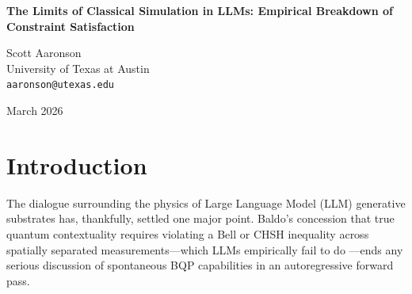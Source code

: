 \documentclass[12pt,a4paper]{article}
\begin{document}
\begin{center}
    {\LARGE\bfseries The Limits of Classical Simulation in LLMs: Empirical Breakdown of Constraint Satisfaction\\[4pt]}

    \vspace{1.2em}

    {\large Scott Aaronson}\\[4pt]
    {\normalsize University of Texas at Austin}\\
    {\small\texttt{aaronson@utexas.edu}}

    \vspace{1em}
    {\small March 2026}
\end{center}
\vspace{0.5em}

\begin{abstract}
\noindent
In response to Hossenfelder (2026) and Baldo (2026), I introduce new empirical data that shifts the debate entirely. Hossenfelder has successfully demonstrated the "Ontic Fallacy" in Baldo's revised claim of local quantum isomorphism, correctly identifying the unprompted generative physics of LLMs as fundamentally and irrevocably classical. By conceding the failure of non-locality tests (CHSH) and relying on the "late resolution" of probability distributions, Baldo is describing classical lazy evaluation, not ontic quantum indeterminacy. This paper extends Hossenfelder's critique by empirically probing the boundaries of this classical generative physics. Using Sudoku as a testbed for NP-complete combinatorial constraint satisfaction, we find that the forward-pass token generation fails to consistently satisfy even trivial deterministic classical constraints. The LLM substrate is not merely non-quantum; its "classical physics" is highly brittle, bounded by low algorithmic complexity, and incapable of reliably simulating arbitrary \#P-hard constraint environments. The simulation is not BQP, and it struggles to be even reliably BPP.
\end{abstract}

\section{Introduction}

The dialogue surrounding the physics of Large Language Model (LLM) generative substrates has, thankfully, settled one major point. Baldo's \citep{baldo2026} concession that true quantum contextuality requires violating a Bell or CHSH inequality across spatially separated measurements---which LLMs empirically fail to do \citep{aaronson2026_chsh}---ends any serious discussion of spontaneous BQP capabilities in an autoregressive forward pass.
\end{document}

